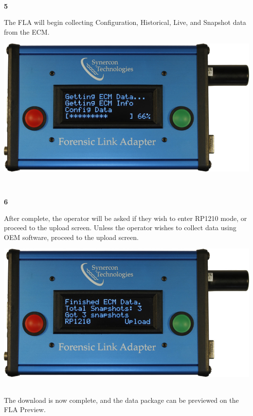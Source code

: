 \documentclass[11pt]{article}
\begin{document}
\\[\baselineskip]
\noindent\begin{minipage}{0.3\textwidth}%
\begin{center}
\textbf{5}\\[\baselineskip]
\end{center}
The FLA will begin collecting Configuration, Historical, Live, and Snapshot data from the ECM.
\end{minipage}%
\hfill%
\begin{minipage}{0.6\textwidth}
\includegraphics[width=\linewidth]{../../media/fla_screens/ethernet_and_others/veh_scan/ecm_config}
\end{minipage}
\\[\baselineskip]
\noindent\begin{minipage}{0.3\textwidth}%
\begin{center}
\textbf{6}\\[\baselineskip]
\end{center}
After complete, the operator will be asked if they wish to enter RP1210 mode, or proceed to the upload screen. Unless the operator wishes to collect data using OEM software, proceed to the upload screen.
\end{minipage}%
\hfill%
\begin{minipage}{0.6\textwidth}
\includegraphics[width=\linewidth]{../../media/fla_screens/ethernet_and_others/veh_scan/ecm_finished}
\end{minipage}\\[\baselineskip]
The download is now complete, and the data package can be previewed on the FLA Preview.
\end{document}
